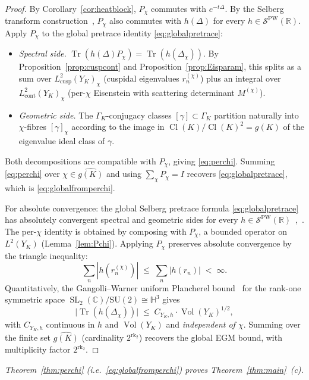 \documentclass[11pt,a4paper,reqno]{amsart}
\theoremstyle{definition}
\DeclareMathOperator{\SL}{SL}
\DeclareMathOperator{\Cl}{Cl}
\DeclareMathOperator{\Vol}{Vol}
\DeclareMathOperator{\Tr}{Tr}
\DeclareMathOperator{\rk}{rk}
\newcommand{\HH}{\mathbb{H}}
\newcommand{\RR}{\mathbb{R}}
\newcommand{\CC}{\mathbb{C}}
\newcommand{\YK}{Y_K}
\newcommand{\GK}{\Gamma_K}
\newcommand{\gK}{g(K)}
\newcommand{\dualgK}{\widehat{g(K)}}
\newcommand{\Lcusp}{L^2_{\mathrm{cusp}}}
\newcommand{\Lcont}{L^2_{\mathrm{cont}}}
\newcommand{\PW}{\mathcal{S}^{\mathrm{PW}}}
\begin{document}
\begin{proof}
By Corollary~\ref{cor:heatblock}, $P_\chi$ commutes with $e^{-t\Delta}$. By the Selberg transform construction~\cite[\S6.6]{ElstrodtGrunewaldMennicke1998}, $P_\chi$ also commutes with $h(\Delta)$ for every $h\in\PW(\RR)$. Apply $P_\chi$ to the global pretrace identity \eqref{eq:globalpretrace}:
\begin{itemize}[leftmargin=2em]
  \item \emph{Spectral side.} $\Tr(h(\Delta)P_\chi) = \Tr(h(\Delta_\chi))$. By Proposition~\ref{prop:cuspcont} and Proposition~\ref{prop:Eisparam}, this splits as a sum over $\Lcusp(\YK)_\chi$ (cuspidal eigenvalues $r_n^{(\chi)}$) plus an integral over $\Lcont(\YK)_\chi$ (per-$\chi$ Eisenstein with scattering determinant $M^{(\chi)}$).
  \item \emph{Geometric side.} The $\GK$-conjugacy classes $[\gamma]\subset\GK$ partition naturally into $\chi$-fibres $[\gamma]_\chi$ according to the image in $\Cl(K)/\Cl(K)^2=\gK$ of the eigenvalue ideal class of $\gamma$.
\end{itemize}
Both decompositions are compatible with $P_\chi$, giving \eqref{eq:perchi}. Summing \eqref{eq:perchi} over $\chi\in\dualgK$ and using $\sum_\chi P_\chi=I$ recovers \eqref{eq:globalpretrace}, which is \eqref{eq:globalfromperchi}.

\smallskip

For absolute convergence: the global Selberg pretrace formula \eqref{eq:globalpretrace} has absolutely convergent spectral and geometric sides for every $h\in\PW(\RR)$~\cite[\S6.4]{ElstrodtGrunewaldMennicke1998},~\cite[\S2.2]{BunkeOlbrich1995}. The per-$\chi$ identity is obtained by composing with $P_\chi$, a bounded operator on $L^2(\YK)$ (Lemma~\ref{lem:Pchi}). Applying $P_\chi$ preserves absolute convergence by the triangle inequality:
\[
  \sum_n |h(r_n^{(\chi)})| \;\leq\; \sum_n |h(r_n)| \;<\; \infty.
\]
Quantitatively, the Gangolli--Warner uniform Plancherel bound~\cite[\S3]{GangolliWarner1980} for the rank-one symmetric space $\SL_2(\CC)/\mathrm{SU}(2)\cong\HH^3$ gives
\[
  \bigl|\Tr(h(\Delta_\chi))\bigr| \;\leq\; C_{\YK,h}\cdot\Vol(\YK)^{1/2},
\]
with $C_{\YK,h}$ continuous in $h$ and $\Vol(\YK)$ and \emph{independent of $\chi$}. Summing over the finite set $\dualgK$ (cardinality $2^{\rk_2}$) recovers the global EGM bound, with multiplicity factor $2^{\rk_2}$.
\end{proof}

\emph{Theorem~\ref{thm:perchi} (i.e.~\eqref{eq:globalfromperchi}) proves Theorem~\ref{thm:main}~(c).}
\end{document}

